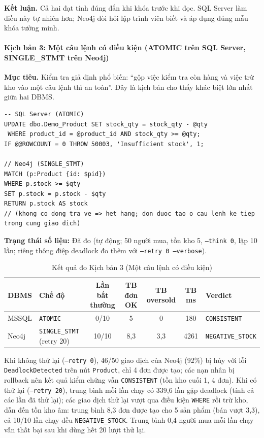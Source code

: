 \textbf{Kết luận.} Cả hai đạt tính đúng đắn khi khóa trước khi đọc. SQL Server làm điều này tự nhiên hơn; Neo4j đòi hỏi lập trình viên biết và áp dụng đúng mẫu khóa tường minh.

\paragraph{Kịch bản 3: Một câu lệnh có điều kiện (ATOMIC trên SQL Server, SINGLE\_STMT trên Neo4j)}
\label{par:tx-kb3}\mbox{}

\textbf{Mục tiêu.} Kiểm tra giả định phổ biến: ``gộp việc kiểm tra còn hàng và việc trừ kho vào một câu lệnh thì an toàn''. Đây là kịch bản cho thấy khác biệt lớn nhất giữa hai DBMS.

\begin{lstlisting}[basicstyle=\ttfamily\small, breaklines=true, frame=single]
-- SQL Server (ATOMIC)
UPDATE dbo.Demo_Product SET stock_qty = stock_qty - @qty
 WHERE product_id = @product_id AND stock_qty >= @qty;
IF @@ROWCOUNT = 0 THROW 50003, 'Insufficient stock', 1;

// Neo4j (SINGLE_STMT)
MATCH (p:Product {id: $pid})
WHERE p.stock >= $qty
SET p.stock = p.stock - $qty
RETURN p.stock AS stock
// (khong co dong tra ve => het hang; don duoc tao o cau lenh ke tiep trong cung giao dich)
\end{lstlisting}

\textbf{Trạng thái số liệu:} Đã đo (tự động; 50 người mua, tồn kho 5, \texttt{--think 0}, lặp 10 lần; riêng thông điệp deadlock đo thêm với \texttt{--retry 0 --verbose}).

\begin{table}[htbp]
\centering
\caption{Kết quả đo Kịch bản 3 (Một câu lệnh có điều kiện)}
\label{tab:tx-kb3}
\renewcommand{\arraystretch}{1.2}
\begin{tabularx}{\textwidth}{l l c c c c X}
\toprule
\textbf{DBMS} & \textbf{Chế độ} & \textbf{Lần bất thường} & \textbf{TB đơn OK} & \textbf{TB oversold} & \textbf{TB ms} & \textbf{Verdict} \\
\midrule
MSSQL & \texttt{ATOMIC} & 0/10 & 5 & 0 & 180 & \texttt{CONSISTENT} \\
Neo4j & \texttt{SINGLE\_STMT} (retry 20) & 10/10 & 8,3 & 3,3 & 4261 & \texttt{NEGATIVE\_STOCK} \\
\bottomrule
\end{tabularx}
\end{table}

Khi không thử lại (\texttt{--retry 0}), 46/50 giao dịch của Neo4j (92\%) bị hủy với lỗi \texttt{DeadlockDetected} trên nút \texttt{Product}, chỉ 4 đơn được tạo; các nạn nhân bị rollback nên kết quả kiểm chứng vẫn \texttt{CONSISTENT} (tồn kho cuối 1, 4 đơn). Khi có thử lại (\texttt{--retry 20}), trung bình mỗi lần chạy có 339,6 lần gặp deadlock (tính cả các lần đã thử lại); các giao dịch thử lại vượt qua điều kiện \texttt{WHERE} rồi trừ kho, dẫn đến tồn kho âm: trung bình 8,3 đơn được tạo cho 5 sản phẩm (bán vượt 3,3), cả 10/10 lần chạy đều \texttt{NEGATIVE\_STOCK}. Trung bình 0,4 người mua mỗi lần chạy vẫn thất bại sau khi dùng hết 20 lượt thử lại.

